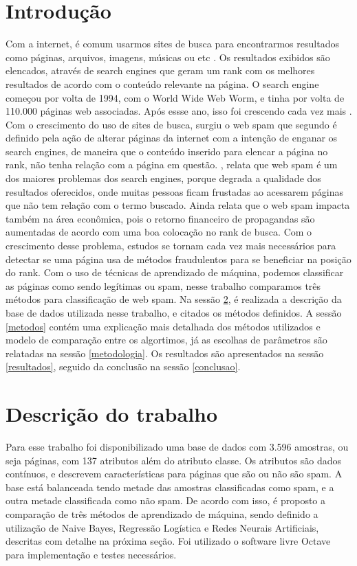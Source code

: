 \documentclass[10pt, conference, compsocconf]{IEEEtran}
\begin{document}
\section{Introdução} 
Com a internet, é comum usarmos sites de busca para encontrarmos resultados como páginas, arquivos, imagens, músicas ou etc . Os resultados exibidos são elencados, através de search engines que geram um rank com os melhores resultados de acordo com o conteúdo relevante na página. O search engine começou por volta de 1994, com o World Wide Web Worm, e tinha por volta de 110.000 páginas web associadas. Após essse ano, isso foi crescendo cada vez mais \cite{1}.
Com o crescimento do uso de sites de busca, surgiu o web spam que segundo \cite{2} é definido pela ação de alterar páginas da internet com a intenção de enganar os search engines, de maneira que o conteúdo inserido para elencar a página no rank, não tenha relação com a página em questão.
\cite{3}, relata que web spam é um dos maiores problemas dos search engines, porque degrada a qualidade dos resultados oferecidos, onde muitas pessoas ficam frustadas ao acessarem páginas que não tem relação com o termo buscado. Ainda relata que o web spam impacta também na área econômica, pois o retorno financeiro de propagandas são aumentadas de acordo com uma boa colocação no rank de busca.
Com o crescimento desse problema, estudos se tornam cada vez mais necessários para detectar se uma página usa de métodos fraudulentos para se beneficiar na posição do rank. Com o uso de técnicas de aprendizado de máquina, podemos classificar as páginas como sendo legítimas ou spam, nesse trabalho comparamos três métodos para classificação de web spam.
Na sessão \ref{descricao}, é realizada a descrição da base de dados utilizada nesse trabalho, e citados os métodos definidos. A sessão \ref{metodos} contém uma explicação mais detalhada dos métodos utilizados e modelo de comparação entre os algortimos, já as escolhas de parâmetros são relatadas na sessão \ref{metodologia}. Os resultados são apresentados na sessão \ref{resultados}, seguido da conclusão na sessão \ref{conclusao}.

\section{Descrição do trabalho}\label{descricao} 
Para esse trabalho foi disponibilizado uma base de dados com 3.596 amostras, ou seja páginas, com 137 atributos além do atributo classe. Os atributos são dados contínuos, e  descrevem características para páginas que são ou não são spam. A base está balanceada tendo metade das amostras classificadas como spam, e a outra metade classificada como não spam.
De acordo com isso, é proposto a comparação de três métodos de aprendizado de máquina, sendo definido a utilização de Naive Bayes, Regressão Logística e Redes Neurais Artificiais, descritas com detalhe na próxima seção.
Foi utilizado o software livre Octave para implementação e testes necessários.
\end{document}
